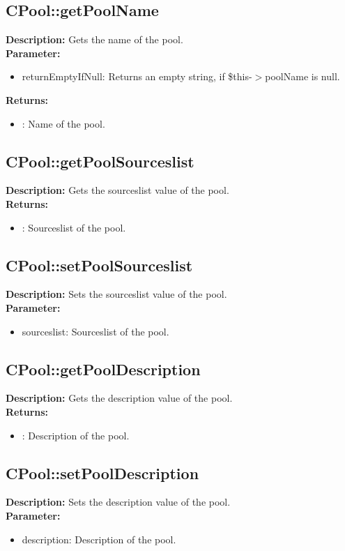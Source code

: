 \subsection{CPool::getPoolName}
\textbf{Description:} Gets the name of the pool.\\
\textbf{Parameter:}
\begin{itemize}
\item returnEmptyIfNull: Returns an empty string, if \$this-$>$poolName is null.
\end{itemize}
\textbf{Returns:}
\begin{itemize}
\item : Name of the pool.
\end{itemize}

\subsection{CPool::getPoolSourceslist}
\textbf{Description:} Gets the sourceslist value of the pool.\\
\textbf{Returns:}
\begin{itemize}
\item : Sourceslist of the pool.
\end{itemize}

\subsection{CPool::setPoolSourceslist}
\textbf{Description:} Sets the sourceslist value of the pool.\\
\textbf{Parameter:}
\begin{itemize}
\item sourceslist: Sourceslist of the pool.
\end{itemize}

\subsection{CPool::getPoolDescription}
\textbf{Description:} Gets the description value of the pool.\\
\textbf{Returns:}
\begin{itemize}
\item : Description of the pool.
\end{itemize}

\subsection{CPool::setPoolDescription}
\textbf{Description:} Sets the description value of the pool.\\
\textbf{Parameter:}
\begin{itemize}
\item description: Description of the pool.
\end{itemize}

